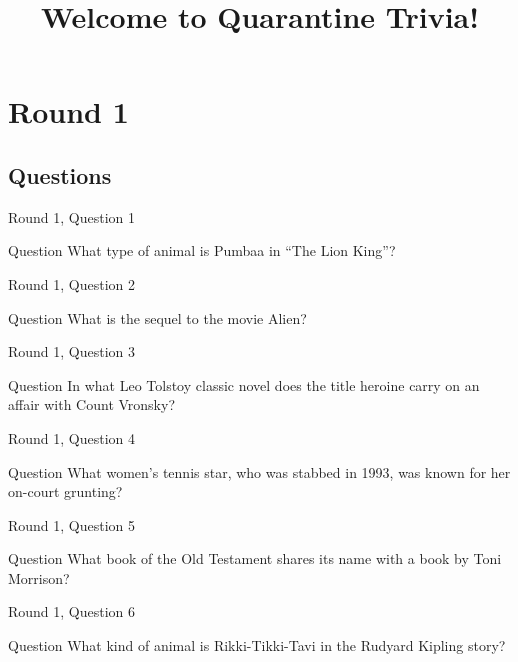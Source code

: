 \documentclass[11pt]{beamer}
\begin{document}
\title{Welcome to Quarantine Trivia!}
\date{}

\begin{frame}
\titlepage{}
\end{frame}
    

\section{Round 1}
    
\subsection{Questions}

\begin{frame}{Round 1, Question 1}
\begin{block}{Question}
What type of animal is Pumbaa in ``The Lion King''\@?
\end{block}
\end{frame}
    

\begin{frame}{Round 1, Question 2}
\begin{block}{Question}
What is the sequel to the movie Alien\@?
\end{block}
\end{frame}
    

\begin{frame}{Round 1, Question 3}
\begin{block}{Question}
In what Leo Tolstoy classic novel does the title heroine carry on an affair with Count Vronsky\@?
\end{block}
\end{frame}
    

\begin{frame}{Round 1, Question 4}
\begin{block}{Question}
What women's tennis star, who was stabbed in 1993, was known for her on-court grunting\@?
\end{block}
\end{frame}
    

\begin{frame}{Round 1, Question 5}
\begin{block}{Question}
What book of the Old Testament shares its name with a book by Toni Morrison\@?
\end{block}
\end{frame}
    

\begin{frame}{Round 1, Question 6}
\begin{block}{Question}
What kind of animal is Rikki-Tikki-Tavi in the Rudyard Kipling story\@?
\end{block}
\end{frame}
    
\end{document}
